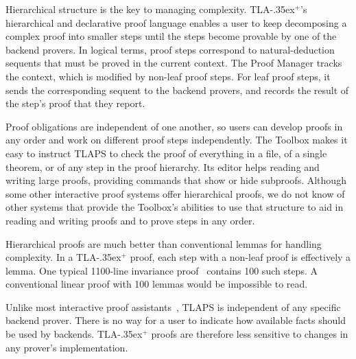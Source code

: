 \documentclass[a4paper,draft]{llncs}
\newcommand{\tlaplus}{\mbox{TLA\kern -.35ex$^+$}\xspace}
\begin{document}
Hierarchical structure is the key to managing complexity.  \tlaplus's
hierarchical and declarative proof language enables a user to keep
decomposing a complex proof into smaller steps until the steps become
provable by one of the backend provers.  In logical terms, proof steps
correspond to natural-deduction sequents that must be proved
in the current context.  The Proof Manager tracks the
context, which is modified by non-leaf proof steps.  For leaf proof
steps, it sends the corresponding sequent to the backend provers, and
records the result of the step's proof that they report.


Proof obligations are independent of one another, so
users can develop proofs in any order and work on different proof
steps independently.  
The Toolbox makes it easy to instruct TLAPS to check the proof of
everything in a file, of a single theorem, or of any step in the proof
hierarchy.
Its editor helps reading and writing
large proofs, providing commands that
show or hide subproofs.
Although some other interactive proof systems offer hierarchical
proofs, we do not know of other systems that provide the Toolbox's
abilities to use that structure to aid in reading and writing proofs
and to prove steps in any order.

Hierarchical proofs are much better than conventional 
lemmas for handling complexity.
In a \tlaplus proof, each step with a non-leaf proof is
effectively a lemma.  One typical 1100-line invariance
proof~\cite{lamport:byzantine-paxos}
contains 100 such steps.  A conventional linear proof with 100 lemmas
would be impossible to read.

Unlike most interactive proof assistants~\cite{wiedijk:provers}, TLAPS
is independent of any specific backend prover.  There is no way for a
user to indicate how available facts should be used by backends.
\tlaplus proofs are therefore less sensitive to changes in any
prover's implementation.
\end{document}
